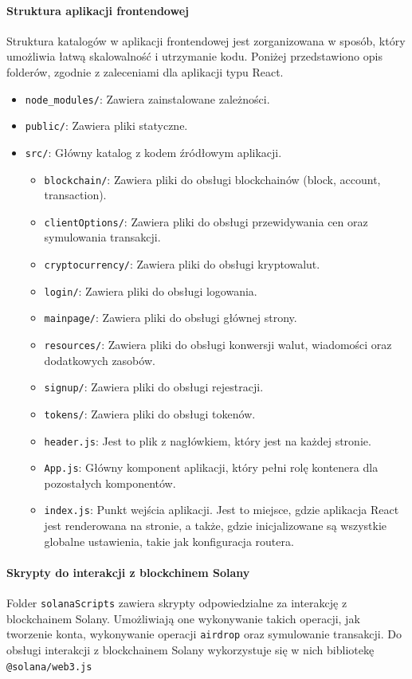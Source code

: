 \paragraph{Struktura aplikacji frontendowej}
Struktura katalogów w aplikacji frontendowej jest zorganizowana w sposób, który umożliwia łatwą skalowalność i utrzymanie kodu. Poniżej przedstawiono opis folderów, zgodnie z zaleceniami dla aplikacji typu React.
\begin{itemize}
    \item \texttt{node\_modules/}: Zawiera zainstalowane zależności.
    \item \texttt{public/}: Zawiera pliki statyczne.
    \item \texttt{src/}: Główny katalog z kodem źródłowym aplikacji.
    \begin{itemize}
        \item \texttt{blockchain/}: Zawiera pliki do obsługi blockchainów (block, account, transaction).
        \item \texttt{clientOptions/}: Zawiera pliki do obsługi przewidywania cen oraz symulowania transakcji.
        \item \texttt{cryptocurrency/}: Zawiera pliki do obsługi kryptowalut.
        \item \texttt{login/}: Zawiera pliki do obsługi logowania.
        \item \texttt{mainpage/}: Zawiera pliki do obsługi głównej strony.
        \item \texttt{resources/}: Zawiera pliki do obsługi konwersji walut, wiadomości oraz dodatkowych zasobów.
        \item \texttt{signup/}: Zawiera pliki do obsługi rejestracji.
        \item \texttt{tokens/}: Zawiera pliki do obsługi tokenów.
        \item \texttt{header.js}: Jest to plik z nagłówkiem, który jest na każdej stronie.
        \item \texttt{App.js}: Główny komponent aplikacji, który pełni rolę kontenera dla pozostałych komponentów.
        \item \texttt{index.js}: Punkt wejścia aplikacji. Jest to miejsce, gdzie aplikacja React jest renderowana na stronie, a także, gdzie inicjalizowane są wszystkie globalne ustawienia, takie jak konfiguracja routera.
    \end{itemize}
\end{itemize}

\paragraph{Skrypty do interakcji z blockchinem Solany}
Folder \texttt{solanaScripts} zawiera skrypty odpowiedzialne za interakcję z blockchainem Solany. Umożliwiają one wykonywanie takich operacji, jak tworzenie konta, wykonywanie operacji \texttt{airdrop} oraz symulowanie transakcji. Do obsługi interakcji z blockchainem Solany wykorzystuje się w nich bibliotekę \texttt{@solana/web3.js}

